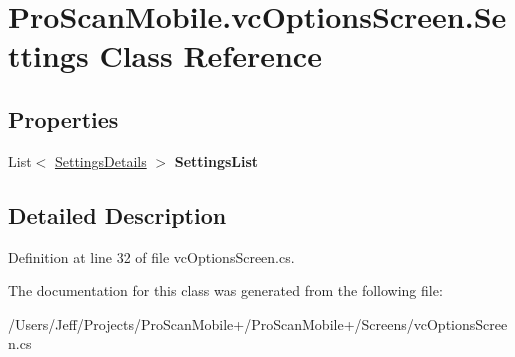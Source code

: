 \hypertarget{class_pro_scan_mobile_1_1vc_options_screen_1_1_settings}{\section{Pro\-Scan\-Mobile.\-vc\-Options\-Screen.\-Settings Class Reference}
\label{class_pro_scan_mobile_1_1vc_options_screen_1_1_settings}
}
\subsection*{Properties}
\begin{DoxyCompactItemize}
\item 
\hypertarget{class_pro_scan_mobile_1_1vc_options_screen_1_1_settings_aaeed636d7ea28816cd217c619760a78f}{List$<$ \hyperlink{class_pro_scan_mobile_1_1vc_options_screen_1_1_settings_details}{Settings\-Details} $>$ {\bfseries Settings\-List}}\label{class_pro_scan_mobile_1_1vc_options_screen_1_1_settings_aaeed636d7ea28816cd217c619760a78f}

\end{DoxyCompactItemize}


\subsection{Detailed Description}


Definition at line 32 of file vc\-Options\-Screen.\-cs.



The documentation for this class was generated from the following file\-:\begin{DoxyCompactItemize}
\item 
/\-Users/\-Jeff/\-Projects/\-Pro\-Scan\-Mobile+/\-Pro\-Scan\-Mobile+/\-Screens/vc\-Options\-Screen.\-cs\end{DoxyCompactItemize}
